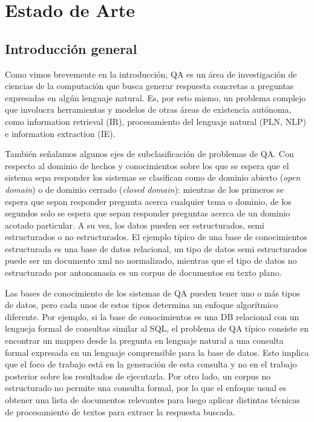 \chapter{Estado de Arte}
\label{chap:estado-de-arte}
\section{Introducción general}
\label{sec:intro-general-qa}
\cerrada
Como vimos brevemente en la introducción, QA es un área de investigación de ciencias de la computación que busca generar respuesta concretas a preguntas expresadas en algún lenguaje natural. Es, por esto mismo, un problema complejo que involucra herramientas y modelos de otras áreas de existencia autónoma, como information retrieval (IR), procesamiento del lenguaje natural (PLN, NLP) e information extraction (IE). 

También señalamos algunos ejes de subclasificación de problemas de QA. Con respecto al dominio de hechos y conocimientos sobre los que se espera que el sistema sepa responder los sistemas se clasifican como de dominio abierto (\textit{open domain}) o de dominio cerrado (\textit{closed domain}): mientras de los primeros se espera que sepan responder pregunta acerca cualquier tema o dominio, de los segundos solo se espera que sepan responder preguntas acerca de un dominio acotado particular. A su vez, los datos pueden ser estructurados, semi estructurados o no estructurados. El ejemplo típico de una base de conocimientos estructurada es una base de datos relacional, un tipo de datos semi estructurados puede ser un documento xml no normalizado, mientras que el tipo de datos no estructurado por antonomasia es un corpus de documentos en texto plano. 

Las bases de conocimiento de los sistemas de QA pueden tener uno o más tipos de datos, pero cada unos de estos tipos determina un enfoque algorítmico diferente. Por ejemplo, si la base de conocimientos es una DB relacional con un lengueja formal de consultas similar al SQL, el problema de QA típico consiste en encontrar un mappeo desde la pregunta en lenguaje natural a una consulta formal expresada en un lenguaje comprensible para la base de datos. Esto implica que el foco de trabajo está en la generación de esta consulta y no en el trabajo posterior sobre los resultados de ejecutarla. Por otro lado, un corpus no estructurado no permite una consulta formal, por lo que el enfoque usual es obtener una lista de documentos relevantes para luego aplicar distintas técnicas de procesamiento de textos para extraer la respuesta buscada. 

